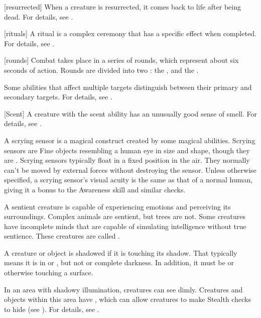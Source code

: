 [resurrected] When a creature is resurrected, it comes back to life after being dead.
For details, see .

[rituals] A ritual is a complex \magical ceremony that has a specific effect when completed.
For details, see .

[rounds] Combat takes place in a series of rounds, which represent about six seconds of action.
Rounds are divided into two : the , and the .

 Some abilities that affect multiple targets distinguish between their primary and secondary targets.
For details, see .

[Scent] A creature with the scent ability has an unusually good sense of smell.
For details, see .

 A scrying sensor is a magical construct created by some magical abilities.
Scrying sensors are Fine objects resembling a human eye in size and shape, though they are .
Scrying sensors typically float in a fixed position in the air.
They normally can't be moved by external forces without destroying the sensor.
Unless otherwise specified, a scrying sensor's visual acuity is the same as that of a normal human, giving it a  bonus to the Awareness skill and similar checks.

 A sentient creature is capable of experiencing emotions and perceiving its surroundings.
Complex animals are sentient, but trees are not.
Some creatures have incomplete minds that are capable of simulating intelligence without true sentience.
These creatures are called .

 A creature or object is shadowed if it is touching its shadow.
That typically means it is in  or , but not  or complete darkness.
In addition, it must be  or otherwise touching a surface.

 In an area with shadowy illumination, creatures can see dimly.
Creatures and objects within this area have , which can allow creatures to make Stealth checks to hide (see ).
For details, see .

